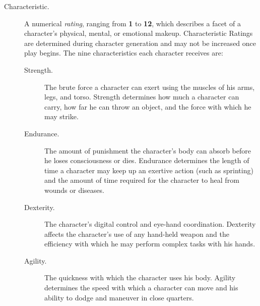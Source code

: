 \begin{description}
\item[Characteristic.] A numerical \emph{rating}, ranging from
  \textbf{1} to \textbf{12}, which describes a facet of a character's
  physical, mental, or emotional makeup. Characteristic Ratings are
  determined during character generation and may not be increased once
  play begins. The nine characteristics each character receives are:

  \begin{description}
  \item[Strength.] The brute force a character can exert using the
    muscles of his arms, legs, and torso. Strength determines how much
    a character can carry, how far he can throw an object, and the
    force with which he may strike.
  \item[Endurance.] The amount of punishment the character's body can
    absorb before he loses consciousness or dies. Endurance determines
    the length of time a character may keep up an exertive action
    (such as sprinting) and the amount of time required for the
    character to heal from wounds or diseases.
  \item[Dexterity.] The character's digital control and eye-hand
    coordination. Dexterity affects the character's use of any
    hand-held weapon and the efficiency with which he may perform
    complex tasks with his hands.
  \item[Agility.] The quickness with which the character uses his
    body. Agility determines the speed with which a character can move
    and his  ability to dodge and maneuver in close quarters.
    

\end{description}
\end{description}
